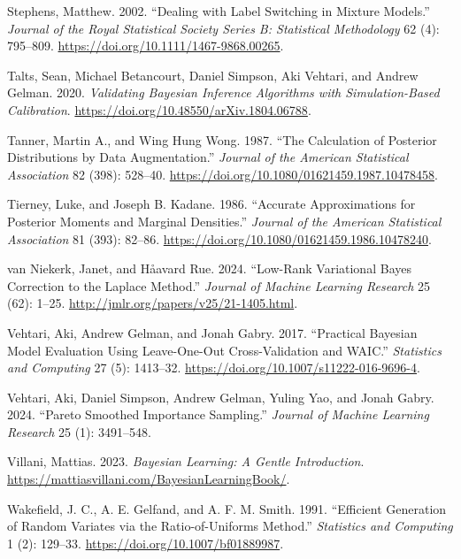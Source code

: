\documentclass[
  11pt,
  letterpaper,
]{scrbook}
\newlength{\cslhangindent}
\newenvironment{CSLReferences}[2] %
 {\begin{list}{}{%
  \setlength{\itemindent}{0pt}
  \setlength{\leftmargin}{0pt}
  \setlength{\parsep}{0pt}
  \ifodd #1
   \setlength{\leftmargin}{\cslhangindent}
   \setlength{\itemindent}{-1\cslhangindent}
  \fi
  \setlength{\itemsep}{#2\baselineskip}}}
 {\end{list}}
\theoremstyle{definition}
\theoremstyle{plain}
\theoremstyle{plain}
\theoremstyle{plain}
\theoremstyle{definition}
\theoremstyle{definition}
\theoremstyle{plain}
\theoremstyle{plain}
\theoremstyle{remark}
\begin{document}
\begin{CSLReferences}{1}{1}
Stephens, Matthew. 2002. {``Dealing with Label Switching in Mixture
Models.''} \emph{Journal of the Royal Statistical Society Series B:
Statistical Methodology} 62 (4): 795--809.
\url{https://doi.org/10.1111/1467-9868.00265}.

Talts, Sean, Michael Betancourt, Daniel Simpson, Aki Vehtari, and Andrew
Gelman. 2020. \emph{Validating {B}ayesian Inference Algorithms with
Simulation-Based Calibration}.
\url{https://doi.org/10.48550/arXiv.1804.06788}.

Tanner, Martin A., and Wing Hung Wong. 1987. {``The Calculation of
Posterior Distributions by Data Augmentation.''} \emph{Journal of the
American Statistical Association} 82 (398): 528--40.
\url{https://doi.org/10.1080/01621459.1987.10478458}.

Tierney, Luke, and Joseph B. Kadane. 1986. {``Accurate Approximations
for Posterior Moments and Marginal Densities.''} \emph{Journal of the
American Statistical Association} 81 (393): 82--86.
\url{https://doi.org/10.1080/01621459.1986.10478240}.

{van Niekerk, Janet, and Håavard Rue}. 2024. {``Low-Rank Variational
{B}ayes Correction to the {L}aplace Method.''} \emph{Journal of Machine
Learning Research} 25 (62): 1--25.
\url{http://jmlr.org/papers/v25/21-1405.html}.

Vehtari, Aki, Andrew Gelman, and Jonah Gabry. 2017. {``Practical
{B}ayesian Model Evaluation Using Leave-One-Out Cross-Validation and
{WAIC}.''} \emph{Statistics and Computing} 27 (5): 1413--32.
\url{https://doi.org/10.1007/s11222-016-9696-4}.

Vehtari, Aki, Daniel Simpson, Andrew Gelman, Yuling Yao, and Jonah
Gabry. 2024. {``Pareto Smoothed Importance Sampling.''} \emph{Journal of
Machine Learning Research} 25 (1): 3491--548.

Villani, Mattias. 2023. \emph{Bayesian Learning: A Gentle Introduction}.
\url{https://mattiasvillani.com/BayesianLearningBook/}.

Wakefield, J. C., A. E. Gelfand, and A. F. M. Smith. 1991. {``Efficient
Generation of Random Variates via the Ratio-of-Uniforms Method.''}
\emph{Statistics and Computing} 1 (2): 129--33.
\url{https://doi.org/10.1007/bf01889987}.


\end{CSLReferences}
\end{document}
